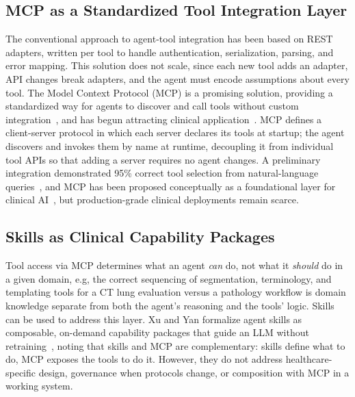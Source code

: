 \documentclass[1p,12pt]{elsarticle}
\begin{document}
\subsection{MCP as a Standardized Tool Integration Layer}
The conventional approach to agent-tool integration has been based on REST adapters, written per tool to handle authentication, serialization, parsing, and error mapping. This solution does not scale, since each new tool adds an adapter, API changes break adapters, and the agent must encode assumptions about every tool. 
The Model Context Protocol (MCP) is a promising solution, providing a standardized way for agents to discover and call tools without custom integration~\cite{mcp-aditi}, and has begun attracting clinical application~\cite{kalathas2026mcp, ehtesham2025mcpfhir}. 
MCP defines a client-server protocol in which each server declares its tools at startup; the agent discovers and invokes them by name at runtime, decoupling it from individual tool APIs so that adding a server requires no agent changes. %
A preliminary integration demonstrated 95\% correct tool selection from natural-language queries~\cite{mcphosts2025}, and MCP has been proposed conceptually as a foundational layer for clinical AI~\cite{transformingclinical2026}, but production-grade clinical deployments remain scarce.

\subsection{Skills as Clinical Capability Packages}
Tool access via MCP determines what an agent \emph{can} do, not what it \emph{should} do in a given domain, e.g, the correct sequencing of segmentation, terminology, and templating tools for a CT lung evaluation versus a pathology workflow is domain knowledge separate from both the agent's reasoning and the tools' logic. Skills can be used to address this layer. Xu and Yan formalize agent skills as composable, on-demand capability packages that guide an LLM without retraining~\cite{agentskillslargelanguage}, noting that skills and MCP are complementary: skills define what to do, MCP exposes the tools to do it. However, they do not address healthcare-specific  design, governance when protocols change, or composition with MCP in a working system.
\end{document}

